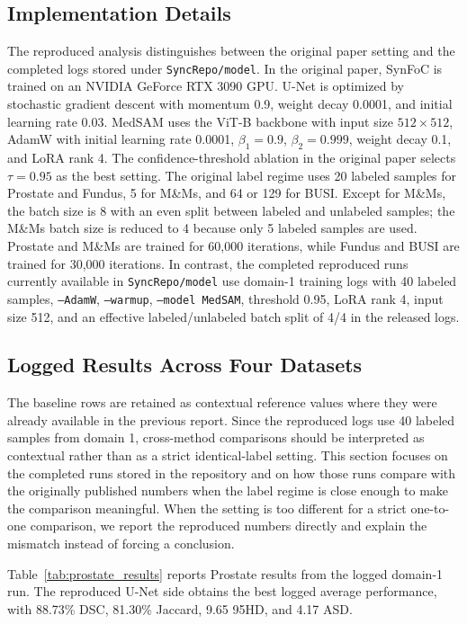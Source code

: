 \subsection{Implementation Details}
The reproduced analysis distinguishes between the original paper setting and the completed logs stored under \texttt{SyncRepo/model}. In the original paper, SynFoC is trained on an NVIDIA GeForce RTX 3090 GPU. U-Net is optimized by stochastic gradient descent with momentum 0.9, weight decay 0.0001, and initial learning rate 0.03. MedSAM uses the ViT-B backbone with input size $512\times512$, AdamW with initial learning rate 0.0001, $\beta_1=0.9$, $\beta_2=0.999$, weight decay 0.1, and LoRA rank 4. The confidence-threshold ablation in the original paper selects $\tau=0.95$ as the best setting. The original label regime uses 20 labeled samples for Prostate and Fundus, 5 for M\&Ms, and 64 or 129 for BUSI. Except for M\&Ms, the batch size is 8 with an even split between labeled and unlabeled samples; the M\&Ms batch size is reduced to 4 because only 5 labeled samples are used. Prostate and M\&Ms are trained for 60,000 iterations, while Fundus and BUSI are trained for 30,000 iterations. In contrast, the completed reproduced runs currently available in \texttt{SyncRepo/model} use domain-1 training logs with 40 labeled samples, \texttt{--AdamW}, \texttt{--warmup}, \texttt{--model MedSAM}, threshold 0.95, LoRA rank 4, input size 512, and an effective labeled/unlabeled batch split of 4/4 in the released logs.

\subsection{Logged Results Across Four Datasets}
The baseline rows are retained as contextual reference values where they were already available in the previous report. Since the reproduced logs use 40 labeled samples from domain 1, cross-method comparisons should be interpreted as contextual rather than as a strict identical-label setting. This section focuses on the completed runs stored in the repository and on how those runs compare with the originally published numbers when the label regime is close enough to make the comparison meaningful. When the setting is too different for a strict one-to-one comparison, we report the reproduced numbers directly and explain the mismatch instead of forcing a conclusion.

Table~\ref{tab:prostate_results} reports Prostate results from the logged domain-1 run. The reproduced U-Net side obtains the best logged average performance, with 88.73\% DSC, 81.30\% Jaccard, 9.65 95HD, and 4.17 ASD.

